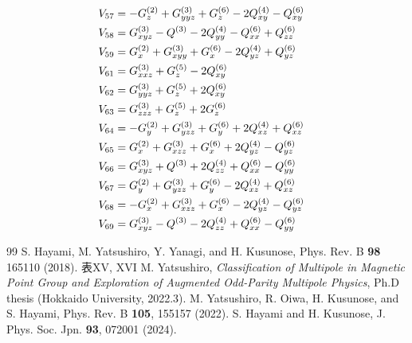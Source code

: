 \documentclass[11pt]{easymemo}
\begin{document}
\begin{align}
\cr&
V_{57}=-G^{(2)}_{z} + G^{(3)}_{yyz} + G^{(6)}_{z} - 2Q^{(4)}_{xy} - Q^{(6)}_{xy}
\cr&
V_{58}=G^{(3)}_{xyz} - Q^{(3)} - 2Q^{(4)}_{yy} - Q^{(6)}_{xx} + Q^{(6)}_{zz}
\cr&
V_{59}=G^{(2)}_{x} + G^{(3)}_{xyy} + G^{(6)}_{x} - 2Q^{(4)}_{yz} + Q^{(6)}_{yz}
\cr&
V_{61}=G^{(3)}_{xxz} + G^{(5)}_{z} - 2Q^{(6)}_{xy}
\cr&
V_{62}=G^{(3)}_{yyz} + G^{(5)}_{z} + 2Q^{(6)}_{xy}
\cr&
V_{63}=G^{(3)}_{zzz} + G^{(5)}_{z} + 2G^{(6)}_{z}
\cr&
V_{64}=-G^{(2)}_{y} + G^{(3)}_{yzz} + G^{(6)}_{y} + 2Q^{(4)}_{xz} + Q^{(6)}_{xz}
\cr&
V_{65}=G^{(2)}_{x} + G^{(3)}_{xzz} + G^{(6)}_{x} + 2Q^{(4)}_{yz} - Q^{(6)}_{yz}
\cr&
V_{66}=G^{(3)}_{xyz} + Q^{(3)} + 2Q^{(4)}_{zz} + Q^{(6)}_{xx} - Q^{(6)}_{yy}
\cr&
V_{67}=G^{(2)}_{y} + G^{(3)}_{yzz} + G^{(6)}_{y} - 2Q^{(4)}_{xz} + Q^{(6)}_{xz}
\cr&
V_{68}=-G^{(2)}_{x} + G^{(3)}_{xzz} + G^{(6)}_{x} - 2Q^{(4)}_{yz} - Q^{(6)}_{yz}
\cr&
V_{69}=G^{(3)}_{xyz} - Q^{(3)} - 2Q^{(4)}_{zz} + Q^{(6)}_{xx} - Q^{(6)}_{yy}
\end{align}


\begin{thebibliography}{99}%
 S. Hayami, M. Yatsushiro, Y. Yanagi, and H. Kusunose, Phys. Rev. B \textbf{98} 165110 (2018). 表XV, XVI
 M. Yatsushiro, \textit{Classification of Multipole in Magnetic Point Group and Exploration of Augmented Odd-Parity Multipole Physics}, Ph.D thesis (Hokkaido University, 2022.3).
 M. Yatsushiro, R. Oiwa, H. Kusunose, and S. Hayami, Phys. Rev. B \textbf{105}, 155157 (2022).
 S. Hayami and H. Kusunose, J. Phys. Soc. Jpn. \textbf{93}, 072001 (2024).
\end{thebibliography}
\end{document}
